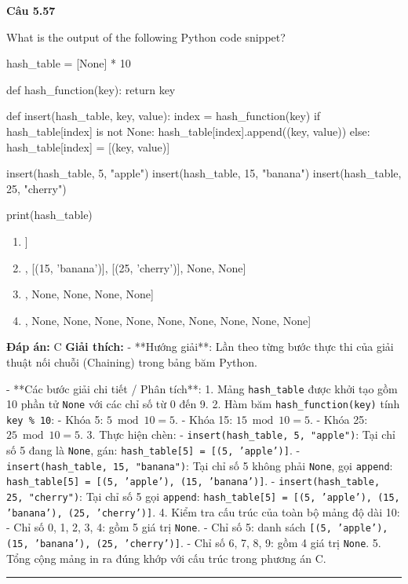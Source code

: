 \documentclass[11pt,a4paper]{article}
\newenvironment{question}[1]{%
  \par\vspace{1em}\noindent\textbf{\large Câu #1}\par\vspace{0.4em}
}{%
  \par\vspace{1em}\hrule\vspace{0.6em}
}
\newenvironment{choices}{%
  \begin{enumerate}[label=\textbf{\Alph*.},leftmargin=2.2em,itemsep=2pt,topsep=3pt]
}{%
  \end{enumerate}
}
\newcommand{\choice}{\item}
\newenvironment{codebox}{%
  \begin{tcolorbox}[colback=gray!8!white,colframe=gray!50!black,arc=1.5mm,boxrule=0.6pt,left=3mm,right=3mm,top=2.5mm,bottom=2.5mm]
  \ttfamily\small
}{%
  \end{tcolorbox}
}
\begin{document}
\begin{question}{5.57}
What is the output of the following Python code snippet?
\begin{codebox}
hash_table = [None] * 10

def hash_function(key):
    return key %

def insert(hash_table, key, value):
    index = hash_function(key)
    if hash_table[index] is not None:
        hash_table[index].append((key, value))
    else:
        hash_table[index] = [(key, value)]

insert(hash_table, 5, "apple")
insert(hash_table, 15, "banana")
insert(hash_table, 25, "cherry")

print(hash_table)
\end{codebox}
\begin{choices}
\choice [None, None, None, None, None, None, None, None, None, [(5, 'apple'), (15, 'banana'), (25, 'cherry')]]
\choice [None, None, None, None, None, [(5, 'apple')], [(15, 'banana')], [(25, 'cherry')], None, None]
\choice [None, None, None, None, None, [(5, 'apple'), (15, 'banana'), (25, 'cherry')], None, None, None, None]
\choice [[(5, 'apple'), (15, 'banana'), (25, 'cherry')], None, None, None, None, None, None, None, None, None]
\end{choices}
\textbf{Đáp án:} C
\textbf{Giải thích:} - **Hướng giải**:
Lần theo từng bước thực thi của giải thuật nối chuỗi (Chaining) trong bảng băm Python.


- **Các bước giải chi tiết / Phân tích**:
1. Mảng \texttt{hash\_table} được khởi tạo gồm 10 phần tử \texttt{None} với các chỉ số từ 0 đến 9.
2. Hàm băm \texttt{hash\_function(key)} tính \texttt{key \% 10}:
   - Khóa 5: \(5 \bmod 10 = 5\).
   - Khóa 15: \(15 \bmod 10 = 5\).
   - Khóa 25: \(25 \bmod 10 = 5\).
3. Thực hiện chèn:
   - \texttt{insert(hash\_table, 5, "apple")}:
     Tại chỉ số 5 đang là \texttt{None}, gán:
     \texttt{hash\_table[5] = [(5, 'apple')]}.
   - \texttt{insert(hash\_table, 15, "banana")}:
     Tại chỉ số 5 không phải \texttt{None}, gọi \texttt{append}:
     \texttt{hash\_table[5] = [(5, 'apple'), (15, 'banana')]}.
   - \texttt{insert(hash\_table, 25, "cherry")}:
     Tại chỉ số 5 gọi \texttt{append}:
     \texttt{hash\_table[5] = [(5, 'apple'), (15, 'banana'), (25, 'cherry')]}.
4. Kiểm tra cấu trúc của toàn bộ mảng độ dài 10:
   - Chỉ số 0, 1, 2, 3, 4: gồm 5 giá trị \texttt{None}.
   - Chỉ số 5: danh sách \texttt{[(5, 'apple'), (15, 'banana'), (25, 'cherry')]}.
   - Chỉ số 6, 7, 8, 9: gồm 4 giá trị \texttt{None}.
5. Tổng cộng mảng in ra đúng khớp với cấu trúc trong phương án C.



\end{question}
\end{document}
